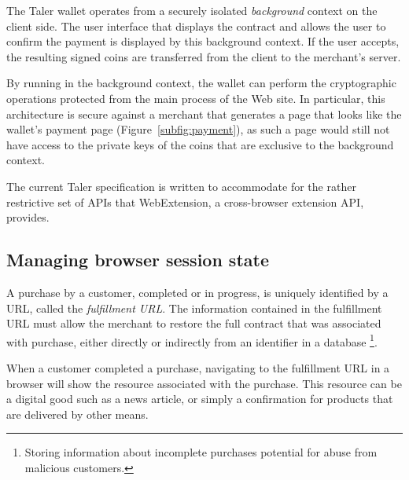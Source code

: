 \documentclass{llncs}
\begin{document}
The Taler wallet operates from a securely isolated {\em background} context on
the client side.  The user interface that displays
the contract and allows the user to confirm the payment is displayed by
this background context.  If the user accepts, the
resulting signed coins are transferred from the client to the
merchant's server.

By running in the background context, the wallet can perform the
cryptographic operations protected from the main process of the Web
site.  In particular, this architecture is secure against a merchant
that generates a page that looks like the wallet's payment page
(Figure~\ref{subfig:payment}), as such a page would still not have
access to the private keys of the coins that are exclusive to the
background context.

The current Taler specification is written to accommodate for
the rather restrictive set of APIs that WebExtension, a
cross-browser extension API, provides.


\subsection{Managing browser session state}






A purchase by a customer, completed or in progress, is uniquely identified by a URL, called
the \emph{fulfillment URL}.  The information contained in the fulfillment
URL must allow the merchant to restore the full contract that was associated
with purchase, either directly or indirectly from an identifier in a database%
\footnote{Storing information about incomplete purchases potential for abuse from malicious customers.}.

When a customer completed a purchase, navigating to the fulfillment URL in a browser
will show the resource associated with the purchase.  This resource can be a
digital good such as a news article, or simply a confirmation for products that
are delivered by other means.
\end{document}
